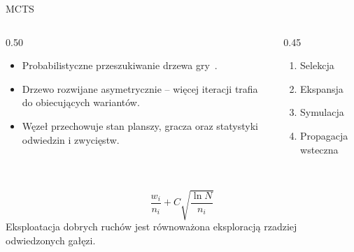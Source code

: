 \documentclass[10pt, aspectratio=169]{beamer}
\begin{document}
\begin{frame}{MCTS}
    \begin{columns}[T]
    \begin{column}{0.50\textwidth}
        \vspace{0.1cm}
        \begin{itemize}
            \item Probabilistyczne przeszukiwanie drzewa gry~\cite{coulom2006efficient}.
            \item Drzewo rozwijane asymetrycznie -- więcej iteracji trafia do obiecujących wariantów.
            \item Węzeł przechowuje stan planszy, gracza oraz statystyki odwiedzin i zwycięstw.
        \end{itemize}
    \end{column}

    \begin{column}{0.45\textwidth}
        \vspace{0.1cm}
        \begin{enumerate}
            \item Selekcja
            \item Ekspansja
            \item Symulacja
            \item Propagacja wsteczna
        \end{enumerate}
    \end{column}
    \end{columns}

    \vspace{0.45cm}

    ~\cite{kocsis2006bandit}
    \[
        \frac{w_i}{n_i} + C \sqrt{\frac{\ln N}{n_i}}
    \]
    \small
    Eksploatacja dobrych ruchów jest równoważona eksploracją rzadziej odwiedzonych gałęzi.
\end{frame}
\end{document}
